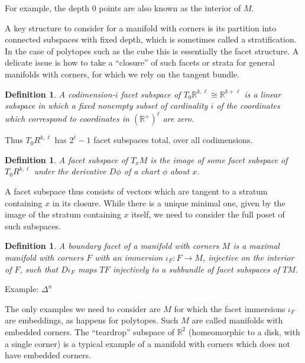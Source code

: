 \documentclass{amsart}          %
\newtheorem{definition}[theorem]{Definition}
\newcommand{\R}{\mathbb R}
\begin{document}
For example, the depth $0$ points are also known as the interior of $M$.
 
A key structure to consider for a manifold with corners is its partition into connected subspaces with fixed depth, which is sometimes
called a stratification.  In the case of polytopes such as the cube this is essentially the facet structure.   A delicate issue is how to take a
``closure'' of such facets or strata for general manifolds with corners, for which we rely on the tangent bundle.

\begin{definition}
A codimension-$i$ facet subspace of $T_0 \R^{k,\ell} \cong \R^{k+\ell}$ is a linear subspace in which a fixed nonempty 
subset of cardinality $i$ of the 
coordinates which correspond to coordinates in $(\R^+)^\ell$  are zero.
\end{definition}

Thus $T_0 R^{k,\ell}$ has $2^\ell - 1$ facet subspaces total, over all codimensions.

\begin{definition}
A facet subspace of $T_x M$ is the image of some facet subspace of $T_0 R^{k,\ell}$ under the derivative $D \phi$ of a chart $\phi$ about $x$.
\end{definition}

A facet subspace thus consists of vectors which are tangent to a stratum containing $x$ in its closure.  
While there is a unique minimal one, given by the image of the stratum containing $x$ itself, we need to consider the full poset of such
subspaces.
 

\begin{definition}
A boundary facet of a manifold with corners $M$ is a maximal manifold with corners $F$ with an immersion 
$\iota_F : F \to M$, injective on the interior of $F$, such that $D\iota_F$ maps $TF$ injectively to a subbundle of facet 
subspaces of $TM$.  
\end{definition}

Example: $\Delta^n$

The only examples we need to consider are $M$ for which the facet immersions $\iota_F$ are embeddings, as happens for polytopes.
Such $M$ are called manifolds with embedded corners.  
The ``teardrop'' subspace of $\R^2$ (homeomorphic to a disk, with a single corner) is  a typical example of a manifold with corners
which does not have embedded corners.
\end{document}
